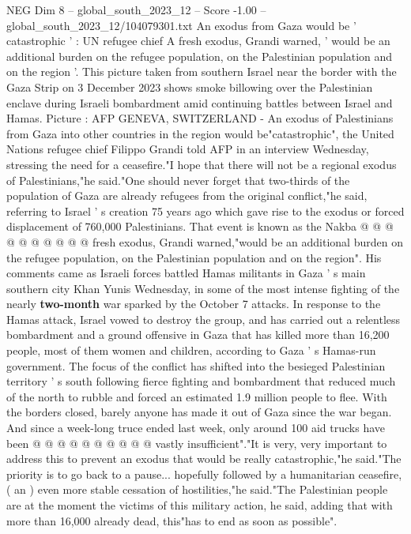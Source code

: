 \begin{textsample}{NEG Dim 8 – global\_south\_2023\_12 – Score -1.00 – global\_south\_2023\_12/104079301.txt}  \label{ex:f8_neg_227}
An exodus from Gaza would be ' catastrophic ' : UN refugee chief A fresh exodus, Grandi warned, ' would be an additional burden on the refugee population, on the Palestinian population and on the region '.
This picture taken from southern Israel near the border with the Gaza Strip on 3 December 2023 shows smoke billowing over the Palestinian enclave during Israeli bombardment amid continuing battles between Israel and Hamas.
Picture : AFP GENEVA, SWITZERLAND - An exodus of Palestinians from Gaza into other countries in the region would be"catastrophic", the United Nations refugee chief Filippo Grandi told AFP in an interview Wednesday, stressing the need for a ceasefire."I hope that there will not be a regional exodus of Palestinians,"he said."One should never forget that two-thirds of the population of Gaza are already refugees from the original conflict,"he said, referring to Israel ' s creation 75 years ago which gave rise to the exodus or forced displacement of 760,000 Palestinians.
That event is known as the Nakba @ @ @ @ @ @ @ @ @ @ fresh exodus, Grandi warned,"would be an additional burden on the refugee population, on the Palestinian population and on the region".
His comments came as Israeli forces battled Hamas militants in Gaza ' s main southern city Khan Yunis Wednesday, in some of the most intense fighting of the nearly \textbf{two-month} war sparked by the October 7 attacks.
In response to the Hamas attack, Israel vowed to destroy the group, and has carried out a relentless bombardment and a ground offensive in Gaza that has killed more than 16,200 people, most of them women and children, according to Gaza ' s Hamas-run government.
The focus of the conflict has shifted into the besieged Palestinian territory ' s south following fierce fighting and bombardment that reduced much of the north to rubble and forced an estimated 1.9 million people to flee.
With the borders closed, barely anyone has made it out of Gaza since the war began.
And since a week-long truce ended last week, only around 100 aid trucks have been @ @ @ @ @ @ @ @ @ @ vastly insufficient"."It is very, very important to address this to prevent an exodus that would be really catastrophic,"he said."The priority is to go back to a pause... hopefully followed by a humanitarian ceasefire, ( an ) even more stable cessation of hostilities,"he said."The Palestinian people are at the moment the victims of this military action, he said, adding that with more than 16,000 already dead, this"has to end as soon as possible".

\end{textsample}

